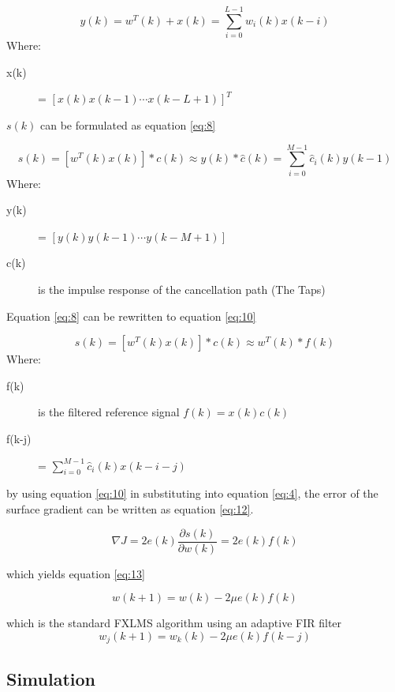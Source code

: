 \begin{equation}\label{eq:6}
y(k) = w^T(k) + x(k) = \sum_{i=0}^{L-1} w_i(k)x(k-i)
\end{equation}
Where:
\begin{description}
	\item[x(k)] = $[x(k) x(k-1) \cdots x(k-L+1)]^T $
\end{description}
$s(k)$ can be formulated as equation \ref{eq:8}

\begin{equation}\label{eq:8}
s(k) = [w^T(k)x(k)]*c(k)\approx y(k)*\hat{c}(k) = \sum_{i=0}^{M-1}\hat{c}_i(k)y(k-1)
\end{equation}
Where:
\begin{description}
	\item[y(k)] = $[ y(k) y(k-1) \cdots y(k-M+1)]$
	\item[c(k)] is the impulse response of the cancellation path (The Taps)
\end{description}

Equation \ref{eq:8} can be rewritten to equation \ref{eq:10}

\begin{equation}\label{eq:10}
s(k) = [w^T(k)x(k)]*c(k)\approx w^T(k)*f(k)
\end{equation}
Where:
\begin{description}
	\item[f(k)] is the filtered reference signal $f(k)=x(k)c(k)$
	\item[f(k-j)] = $\sum_{i=0}^{M-1}\hat{c}_i(k)x(k-i-j)$
\end{description}

by using equation \ref{eq:10} in substituting into equation \ref{eq:4}, the error of the surface gradient can be written as equation \ref{eq:12}.

\begin{equation}\label{eq:12}
\nabla J = 2e(k)\frac{\partial s(k)}{\partial w(k)} = 2e(k)f(k)
\end{equation}

which yields equation \ref{eq:13}

\begin{equation}\label{eq:13}
w(k+1) = w(k) - 2\mu e(k)f(k)
\end{equation}

which is the standard FXLMS algorithm using an adaptive FIR filter
\begin{equation}\label{eq:14}
w_j(k+1) = w_k(k) - 2\mu e(k)f(k-j)
\end{equation}


\subsection*{Simulation} 